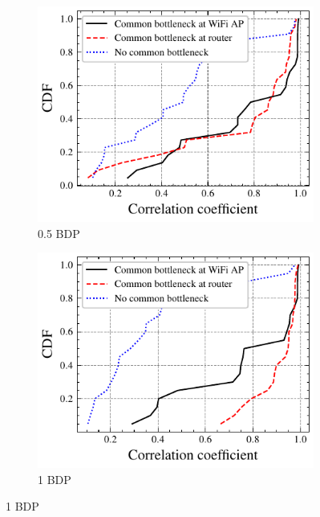 \begin{figure}
  \centering
  \begin{subfigure}{0.49\textwidth}
    \centering
    \includegraphics[width=\textwidth]{figures/bdp/bdp-05-no-only-video.pdf}
    \caption{\label{subfig:bdp-10}0.5 BDP}
  \end{subfigure}%
  \hfill
  \begin{subfigure}{0.49\textwidth}
    \centering
    \includegraphics[width=\textwidth]{figures/bdp/bdp-10-no-only-video.pdf}
    \caption{\label{subfig:bdp-10}1 BDP}
  \end{subfigure}%
  \vspace{1ex}

\end{figure}
